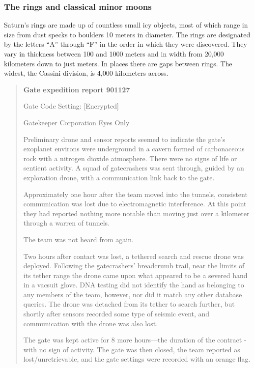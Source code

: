 \subsubsection{The rings and classical minor moons}
\label{sec:rings-class-minor} 

Saturn's rings are made up of countless small icy objects, most of which range in size from dust specks to boulders 10 meters in diameter. The rings are designated by the letters “A” through “F” in the order in which they were discovered. They vary in thickness between 100 and 1000 meters and in width from 20,000 kilometers down to just meters. In places there are gaps between rings. The widest, the Cassini division, is 4,000 kilometers across. 


 \begin{quotation}
\textbf{Gate expedition report 901127}

Gate Code Setting: [Encrypted]

Gatekeeper Corporation Eyes Only 

Preliminary drone and sensor reports seemed to indicate the gate’s exoplanet environs were underground in a cavern formed of carbonaceous rock with a nitrogen dioxide atmosphere. There were no signs of life or sentient activity. A squad of gatecrashers was sent through, guided by an exploration drone, with a communication link back to the gate. 

Approximately one hour after the team moved into the tunnels, consistent communication was lost due to electromagnetic interference. At this point they had reported nothing more notable than moving just over a kilometer through a warren of tunnels. 

The team was not heard from again. 

Two hours after contact was lost, a tethered search and rescue drone was deployed. Following the gatecrashers’ breadcrumb trail, near the limits of its tether range the drone came upon what appeared to be a severed hand in a vacsuit glove. DNA testing did not identify the hand as belonging to any members of the team, however, nor did it match any other database queries. The drone was detached from its tether to search further, but shortly after sensors recorded some type of seismic event, and communication with the drone was also lost. 

The gate was kept active for 8 more hours—the duration of the contract - with no sign of activity. The gate was then closed, the team reported as lost/unretrievable, and the gate settings were recorded with an orange flag.
\end{quotation} 

